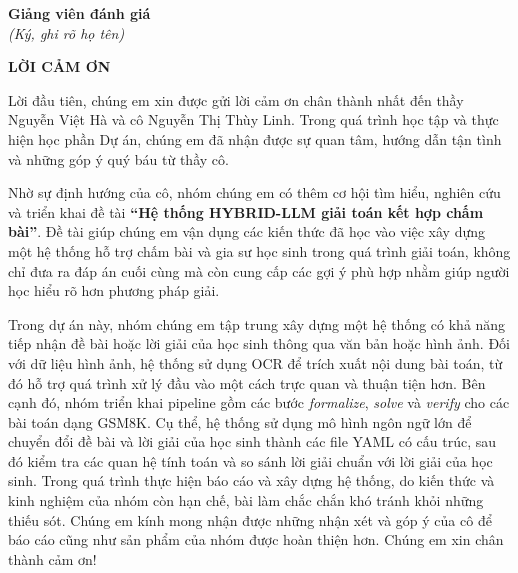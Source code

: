 \documentclass[12pt,a4paper]{article}
\begin{document}
\vspace{1cm}

\begin{flushright}
    \textbf{Giảng viên đánh giá}\\
    \textit{(Ký, ghi rõ họ tên)}
\end{flushright}


\newpage
\thispagestyle{empty}

\begin{center}
    {\Large \textbf{LỜI CẢM ƠN}}
\end{center}

\vspace{0.8cm}




Lời đầu tiên, chúng em xin được gửi lời cảm ơn chân thành nhất đến thầy Nguyễn Việt Hà và cô Nguyễn Thị Thùy Linh. 
Trong quá trình học tập và thực hiện học phần Dự án, chúng em đã nhận được sự quan tâm, 
hướng dẫn tận tình và những góp ý quý báu từ thầy cô.

Nhờ sự định hướng của cô, nhóm chúng em có thêm cơ hội tìm hiểu, nghiên cứu và triển khai đề tài 
\textbf{``Hệ thống HYBRID-LLM giải toán kết hợp chấm bài''}. 
Đề tài giúp chúng em vận dụng các kiến thức đã học vào việc xây dựng một hệ thống hỗ trợ chấm bài và gia sư học sinh trong quá trình giải toán, 
không chỉ đưa ra đáp án cuối cùng mà còn cung cấp các gợi ý phù hợp nhằm giúp người học hiểu rõ hơn phương pháp giải.

Trong dự án này, nhóm chúng em tập trung xây dựng một hệ thống có khả năng tiếp nhận đề bài hoặc lời giải của học sinh thông qua văn bản hoặc hình ảnh. Đối với dữ liệu hình ảnh, hệ thống sử dụng OCR để trích xuất nội dung bài toán, từ đó hỗ trợ quá trình xử lý đầu vào một cách trực quan và thuận tiện hơn. Bên cạnh đó, nhóm triển khai pipeline gồm các bước \textit{formalize}, \textit{solve} và \textit{verify} cho các bài toán dạng GSM8K. Cụ thể, hệ thống sử dụng mô hình ngôn ngữ lớn để chuyển đổi đề bài và lời giải của học sinh thành các file YAML có cấu trúc, sau đó kiểm tra các quan hệ tính toán và so sánh lời giải chuẩn với lời giải của học sinh. Trong quá trình thực hiện báo cáo và xây dựng hệ thống, do kiến thức và kinh nghiệm của nhóm còn hạn chế, bài làm chắc chắn khó tránh khỏi những thiếu sót. Chúng em kính mong nhận được những nhận xét và góp ý của cô để báo cáo cũng như sản phẩm của nhóm được hoàn thiện hơn. 
Chúng em xin chân thành cảm ơn!
\end{document}
